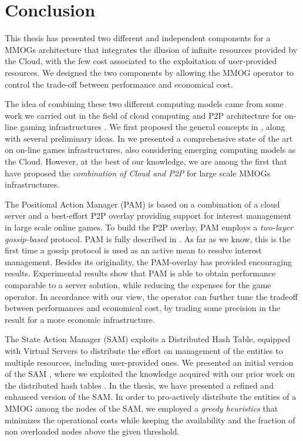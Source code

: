 \documentclass[final,10pt,a5paper]{phdimt}
\theoremstyle{definition}
\begin{document}
\clearpage{}
\clearpage{}
\chapter{Conclusion}
\label{chap:conclusion}




This thesis has presented two different and independent components for a MMOGs architecture that integrates the illusion of infinite resources provided by the Cloud, with the few cost associated to the exploitation of user-provided resources. We designed the two components by allowing the MMOG operator to control the trade-off between performance and economical cost.

The idea of combining these two different computing models came from some work we carried out in the field of cloud computing \cite{carlini2012cloud} and P2P architecture for on-line gaming infrastructures \cite{ricci2011aoi}. We first proposed the general concepts in \cite{carlini2010integration}, along with several preliminary ideas.
In \cite{ricci2012tutorial} we presented a comprehensive state of the art on on-line games infrastructures, also considering emerging computing models as the Cloud.
However, at the best of our knowledge, we are among the first that have proposed the \textit{combination of Cloud and P2P} for large scale MMOGs infrastructures.


The Positional Action Manager (PAM) is based on a combination of a cloud server and a best-effort P2P overlay providing support for interest management in large scale online games. To build the P2P overlay, PAM employs a \textit{two-layer gossip-based} protocol. 
PAM is fully described in \cite{gossipim,netgames12}.
As far as we know, this is the first time a gossip protocol is used as an active mean to resolve interest management. Besides its originality, the PAM-overlay has provided encouraging results. 
Experimental results show that PAM is able to obtain performance comparable to a server solution, while reducing the expenses for the game operator. In accordance with our view, the operator can further tune the tradeoff between performances and economical cost, by trading some precision in the result for a more economic infrastructure.



The State Action Manager (SAM) exploits a Distributed Hash Table, equipped with Virtual Servers to distribute the effort on management of the entities to multiple resources, including user-provided ones. 
We presented an initial version of the SAM \cite{pos}, where we exploited the knowledge acquired with our prior work on the distributed hash tables \cite{carlini2010reducing,carlini2011probabilistic}. In the thesis, we have presented a refined and enhanced version of the SAM. 
In order to pro-actively distribute the entities of a MMOG among the nodes of the SAM, we employed a \textit{greedy heuristics} that minimizes the operational costs while keeping the availability and the fraction of non overloaded nodes above the given threshold. 
\end{document}
